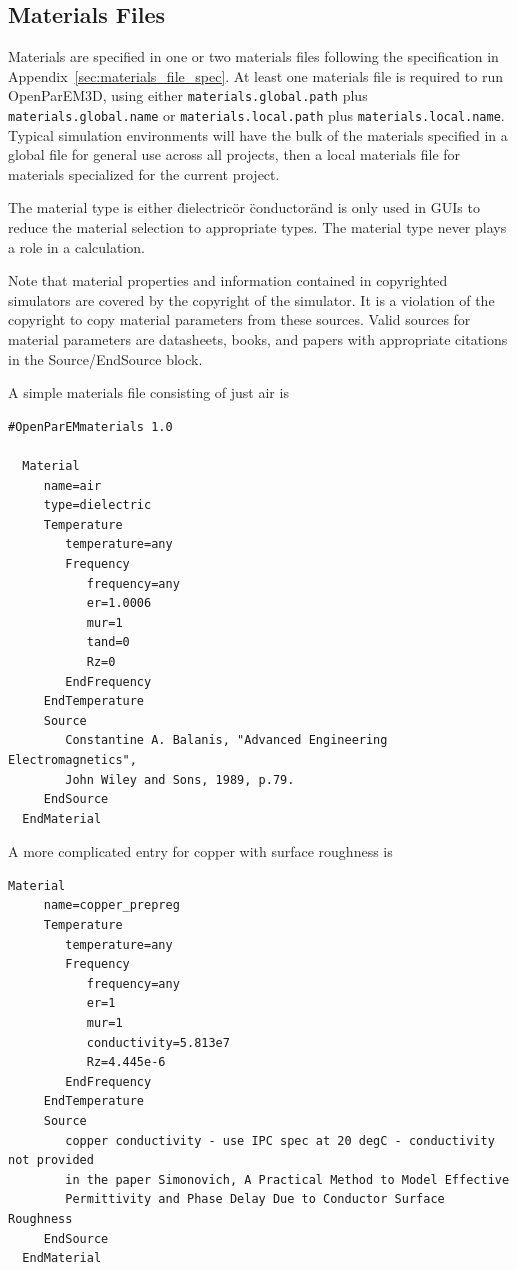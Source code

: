 \documentclass[titlepage]{article}
\renewcommand\_{\textunderscore\linebreak[1]}
\begin{document}
\subsection{Materials Files}

Materials are specified in one or two materials files following the specification in Appendix~\ref{sec:materials_file_spec}.  At least one materials file is required to run OpenParEM3D, using either \texttt{materials.global.path} plus \newline \texttt{materials.global.name} or \texttt{materials.local.path} plus \texttt{materials.local.name}.  Typical simulation environments will have the bulk of the materials specified in a global file for general use across all projects, then a local materials file for materials specialized for the current project.

The material type is either \"dielectric\" or \"conductor\" and is only used in GUIs to reduce the material selection to appropriate types.  The material type never plays a role in a calculation.

Note that material properties and information contained in copyrighted simulators are covered by the copyright of the simulator.  It is a violation of the copyright to copy material parameters from these sources.  Valid sources for material parameters are datasheets, books, and papers with appropriate citations in the Source/EndSource block.

A simple materials file consisting of just air is
\begin{Verbatim}[fontsize=\small]
  #OpenParEMmaterials 1.0

  Material
     name=air
     type=dielectric
     Temperature
        temperature=any
        Frequency
           frequency=any
           er=1.0006
           mur=1
           tand=0
           Rz=0
        EndFrequency
     EndTemperature
     Source
        Constantine A. Balanis, "Advanced Engineering Electromagnetics",
        John Wiley and Sons, 1989, p.79.
     EndSource
  EndMaterial
\end{Verbatim}

\noindent A more complicated entry for copper with surface roughness is
\begin{Verbatim}[fontsize=\small]
  Material
     name=copper_prepreg
     Temperature
        temperature=any
        Frequency
           frequency=any
           er=1
           mur=1
           conductivity=5.813e7
           Rz=4.445e-6
        EndFrequency
     EndTemperature
     Source
        copper conductivity - use IPC spec at 20 degC - conductivity not provided
        in the paper Simonovich, A Practical Method to Model Effective 
        Permittivity and Phase Delay Due to Conductor Surface Roughness
     EndSource
  EndMaterial
\end{Verbatim}
\end{document}
